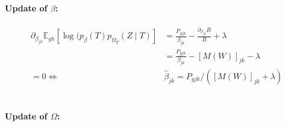 \documentclass[11pt,a4paper]{article}
\newcommand{\Esp}{\mathds{E}}
\begin{document}
\paragraph{Update of $\beta$:}
\begin{align*}
\partial_{\beta_{jk}} \Esp_{gh} [\log (p_\beta(T)p_{\Omega_T}(Z\mid T) ] &= \frac{P_{gjk}}{\beta_{jk}} - \frac{\partial_{\beta_{jk}} B }{B} + \lambda\\
&=\frac{P_{gjk}}{\beta_{jk}}  - [M(W)]_{jk} - \lambda\\
=0 \iff & \boxed{\widehat{\beta}_{jk} = P_{gjk} / ([M(W)]_{jk} + \lambda)}
\end{align*}\\


\paragraph{Update of $\Omega$:}
\end{document}
